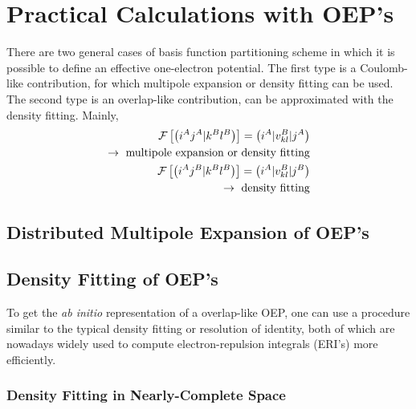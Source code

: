 \section{\label{s.334}Practical Calculations with OEP's}

There are two general cases of basis function partitioning scheme
in which it is possible to define an effective one\hyp{}electron
potential.
The first type is a Coulomb\hyp{}like contribution, for which multipole expansion or density fitting can be used.
The second type is an overlap\hyp{}like contribution, can be approximated with the density fitting. Mainly,
%
\begin{subequations}
 \begin{align}
 \mathcal{F}
 \left[ 
   \ERIc{i^A}{j^A}{k^B}{l^B}
	 \right] = \OEIc{i^A}{v_{kl}^B}{j^A} \\ \nonumber \rightarrow \text{ multipole expansion or density fitting}\\ 
%
 \mathcal{F}
 \left[ 
   \ERIc{i^A}{j^B}{k^B}{l^B}
	 \right] = \OEIc{i^A}{v_{kl}^B}{j^B} \\ \rightarrow \text{ density fitting} \nonumber
 \end{align}
\end{subequations}
%

\subsection{\label{s.333}Distributed Multipole Expansion of OEP's}

\subsection{\label{s.334}Density Fitting of OEP's}

To get the \emph{ab initio} representation of a overlap\hyp{}like OEP, 
one can use a procedure similar to
the typical density fitting or resolution of identity, both of which are nowadays widely used 
to compute electron-repulsion integrals (ERI's) more efficiently. 

\subsubsection{Density Fitting in Nearly-Complete Space}


